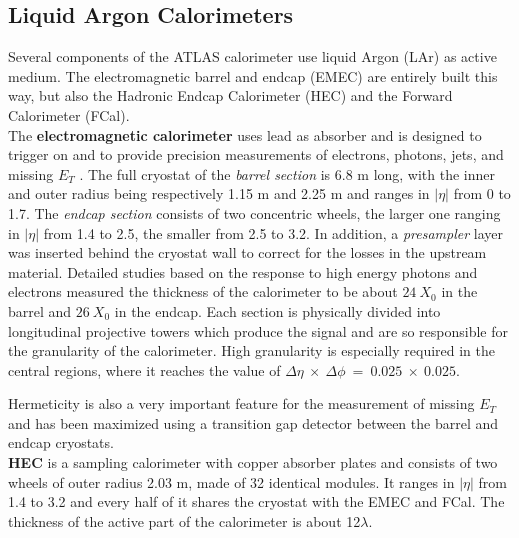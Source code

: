 \documentclass[a4paper,twoside,12pt]{book}
\begin{document}
\subsection*{Liquid Argon Calorimeters}\label{sec:LAr}
Several components of the ATLAS calorimeter use liquid Argon (LAr) as active medium\cite{current_EMCal}. The electromagnetic barrel and endcap (EMEC) are entirely built this way, but also the Hadronic Endcap Calorimeter (HEC) and the Forward Calorimeter (FCal). \\[2pt]
The \textbf{electromagnetic calorimeter} uses lead as absorber and is designed to trigger on and to provide precision measurements of electrons, photons, jets, and missing $E_T$ .
The full cryostat of the \textit{barrel section} is 6.8 m long, with the inner and outer radius being respectively 1.15 m and 2.25 m and ranges in $|\eta|$ from 0 to 1.7.  The \textit{endcap section} consists of two concentric wheels, the larger one ranging in $|\eta|$ from 1.4 to 2.5, the smaller from 2.5 to 3.2. In addition, a \textit{presampler} layer was inserted behind the cryostat wall to correct for the losses in the upstream material. 
Detailed studies based on the response to high energy photons and electrons
measured the thickness of the calorimeter to be about $24\ X_0$ in the barrel and $26\ X_0$ in the endcap. Each section is physically divided into longitudinal projective towers which produce the signal and are so responsible
for the granularity of the calorimeter.
High granularity is especially required in the central regions, where it reaches the value of 
$\Delta\eta\ \times\ \Delta\phi\ =\ 0.025\ \times\ 0.025$.

Hermeticity is also a very important feature for the measurement of missing $E_T$ and has been maximized using a transition gap detector between the barrel and endcap cryostats. \\

\textbf{HEC}\cite{hec} is a sampling calorimeter with copper absorber plates and consists of two wheels of outer radius 2.03 m, made of 32 identical modules. It ranges in $|\eta|$ from 1.4 to 3.2 and every half of it shares the cryostat with the EMEC and FCal. The thickness of the active part of the calorimeter is about 12$\lambda$.\\
\end{document}

